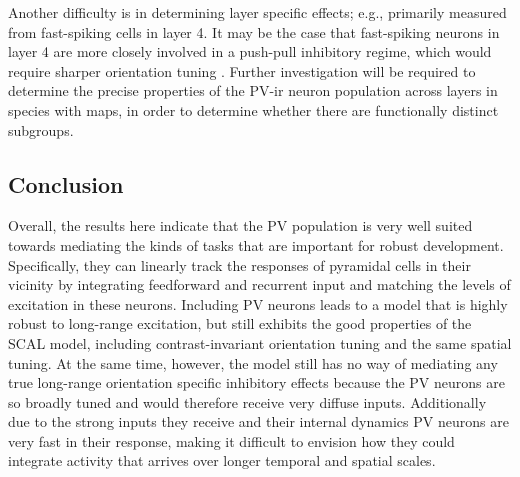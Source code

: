 Another difficulty is in determining layer specific effects; e.g.,
\cite{Cardin2007} primarily measured from fast-spiking cells in layer
4. It may be the case that fast-spiking neurons in layer 4 are more
closely involved in a push-pull inhibitory regime, which would require
sharper orientation tuning \citep{Hirsch2003, Hirsch2006a}. Further
investigation will be required to determine the precise properties of
the PV-ir neuron population across layers in species with maps, in
order to determine whether there are functionally distinct subgroups.

\subsection{Conclusion}

Overall, the results here indicate that the PV population is very well
suited towards mediating the kinds of tasks that are important for
robust development. Specifically, they can linearly track the
responses of pyramidal cells in their vicinity by integrating
feedforward and recurrent input and matching the levels of excitation
in these neurons. Including PV neurons leads to a model that is highly
robust to long-range excitation, but still exhibits the good
properties of the SCAL model, including contrast-invariant orientation
tuning and the same spatial tuning. At the same time, however, the
model still has no way of mediating any true long-range orientation
specific inhibitory effects because the PV neurons are so broadly
tuned and would therefore receive very diffuse inputs. Additionally
due to the strong inputs they receive and their internal dynamics PV
neurons are very fast in their response, making it difficult to
envision how they could integrate activity that arrives over longer
temporal and spatial scales.
